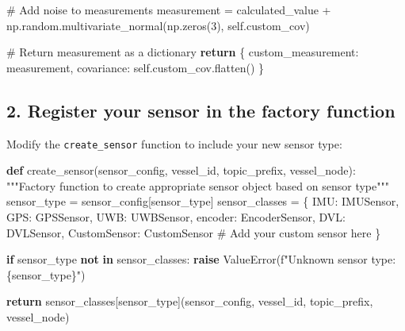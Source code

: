 \documentclass[
  letterpaper,
  DIV=11,
  numbers=noendperiod]{scrreprt}
\newenvironment{Shaded}{\begin{snugshade}}{\end{snugshade}}
\newcommand{\CommentTok}[1]{\textcolor[rgb]{0.37,0.37,0.37}{#1}}
\newcommand{\ControlFlowTok}[1]{\textcolor[rgb]{0.00,0.23,0.31}{\textbf{#1}}}
\newcommand{\DecValTok}[1]{\textcolor[rgb]{0.68,0.00,0.00}{#1}}
\newcommand{\KeywordTok}[1]{\textcolor[rgb]{0.00,0.23,0.31}{\textbf{#1}}}
\newcommand{\NormalTok}[1]{\textcolor[rgb]{0.00,0.23,0.31}{#1}}
\newcommand{\OperatorTok}[1]{\textcolor[rgb]{0.37,0.37,0.37}{#1}}
\newcommand{\PreprocessorTok}[1]{\textcolor[rgb]{0.68,0.00,0.00}{#1}}
\newcommand{\SpecialCharTok}[1]{\textcolor[rgb]{0.37,0.37,0.37}{#1}}
\newcommand{\SpecialStringTok}[1]{\textcolor[rgb]{0.13,0.47,0.30}{#1}}
\newcommand{\StringTok}[1]{\textcolor[rgb]{0.13,0.47,0.30}{#1}}
\newcommand{\VariableTok}[1]{\textcolor[rgb]{0.07,0.07,0.07}{#1}}
\begin{document}
\begin{Shaded}
\begin{Highlighting}[]
        \CommentTok{\# Add noise to measurements}
\NormalTok{        measurement }\OperatorTok{=}\NormalTok{ calculated\_value }\OperatorTok{+}\NormalTok{ np.random.multivariate\_normal(np.zeros(}\DecValTok{3}\NormalTok{), }\VariableTok{self}\NormalTok{.custom\_cov)}
        
        \CommentTok{\# Return measurement as a dictionary}
        \ControlFlowTok{return}\NormalTok{ \{}
            \StringTok{\textquotesingle{}custom\_measurement\textquotesingle{}}\NormalTok{: measurement,}
            \StringTok{\textquotesingle{}covariance\textquotesingle{}}\NormalTok{: }\VariableTok{self}\NormalTok{.custom\_cov.flatten()}
\NormalTok{        \}}
\end{Highlighting}
\end{Shaded}

\subsection*{2. Register your sensor in the factory
function}\label{register-your-sensor-in-the-factory-function}

Modify the \texttt{create\_sensor} function to include your new sensor
type:

\begin{Shaded}
\begin{Highlighting}[]
\KeywordTok{def}\NormalTok{ create\_sensor(sensor\_config, vessel\_id, topic\_prefix, vessel\_node):}
    \CommentTok{"""Factory function to create appropriate sensor object based on sensor type"""}
\NormalTok{    sensor\_type }\OperatorTok{=}\NormalTok{ sensor\_config[}\StringTok{\textquotesingle{}sensor\_type\textquotesingle{}}\NormalTok{]}
\NormalTok{    sensor\_classes }\OperatorTok{=}\NormalTok{ \{}
        \StringTok{\textquotesingle{}IMU\textquotesingle{}}\NormalTok{: IMUSensor,}
        \StringTok{\textquotesingle{}GPS\textquotesingle{}}\NormalTok{: GPSSensor,}
        \StringTok{\textquotesingle{}UWB\textquotesingle{}}\NormalTok{: UWBSensor,}
        \StringTok{\textquotesingle{}encoder\textquotesingle{}}\NormalTok{: EncoderSensor,}
        \StringTok{\textquotesingle{}DVL\textquotesingle{}}\NormalTok{: DVLSensor,}
        \StringTok{\textquotesingle{}CustomSensor\textquotesingle{}}\NormalTok{: CustomSensor  }\CommentTok{\# Add your custom sensor here}
\NormalTok{    \}}
    
    \ControlFlowTok{if}\NormalTok{ sensor\_type }\KeywordTok{not} \KeywordTok{in}\NormalTok{ sensor\_classes:}
        \ControlFlowTok{raise} \PreprocessorTok{ValueError}\NormalTok{(}\SpecialStringTok{f"Unknown sensor type: }\SpecialCharTok{\{}\NormalTok{sensor\_type}\SpecialCharTok{\}}\SpecialStringTok{"}\NormalTok{)}
        
    \ControlFlowTok{return}\NormalTok{ sensor\_classes[sensor\_type](sensor\_config, vessel\_id, topic\_prefix, vessel\_node)}
\end{Highlighting}
\end{Shaded}
\end{document}
